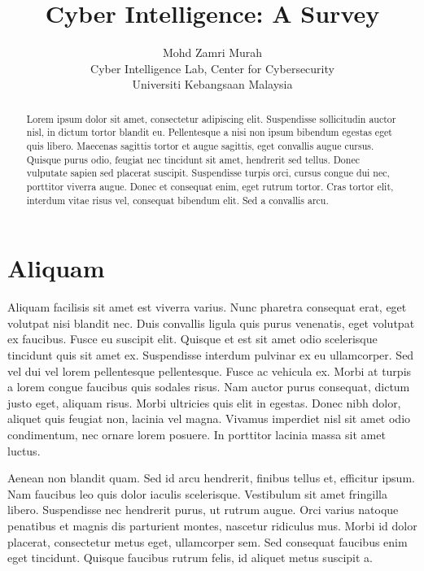 \documentclass[12pt]{article} %
\title{Cyber Intelligence: A Survey}
\author{Mohd Zamri Murah\\
\small{Cyber Intelligence Lab, Center for Cybersecurity}\\
\small{Universiti Kebangsaan Malaysia}}
\date{} %
\begin{document}
\nocite{*}

\maketitle

\begin{abstract}
Lorem ipsum dolor sit amet, consectetur adipiscing elit. Suspendisse sollicitudin auctor nisl, in
dictum tortor blandit eu. Pellentesque a nisi non ipsum bibendum egestas eget quis libero. Maecenas
sagittis tortor et augue sagittis, eget convallis augue cursus. Quisque purus odio, feugiat nec
tincidunt sit amet, hendrerit sed tellus. Donec vulputate sapien sed placerat suscipit. Suspendisse
turpis orci, cursus congue dui nec, porttitor viverra augue. Donec et consequat enim, eget rutrum
tortor. Cras tortor elit, interdum vitae risus vel, consequat bibendum elit. Sed a convallis arcu.
\end{abstract}

\section{Aliquam}


Aliquam facilisis sit amet est viverra varius. Nunc pharetra consequat erat, eget volutpat nisi
blandit nec. Duis convallis ligula quis purus venenatis, eget volutpat ex faucibus. Fusce eu suscipit
elit. Quisque et est sit amet odio scelerisque tincidunt quis sit amet ex. Suspendisse interdum
pulvinar ex eu ullamcorper. Sed vel dui vel lorem pellentesque pellentesque. Fusce ac vehicula ex.
Morbi at turpis a lorem congue faucibus quis sodales risus. Nam auctor purus consequat, dictum justo
eget, aliquam risus. Morbi ultricies quis elit in egestas. Donec nibh dolor, aliquet quis feugiat non,
lacinia vel magna. Vivamus imperdiet nisl sit amet odio condimentum, nec ornare lorem posuere. In
porttitor lacinia massa sit amet luctus.

Aenean non blandit quam. Sed id arcu hendrerit, finibus tellus et, efficitur ipsum. Nam faucibus leo
quis dolor iaculis scelerisque. Vestibulum sit amet fringilla libero. Suspendisse nec hendrerit purus,
ut rutrum augue. Orci varius natoque penatibus et magnis dis parturient montes, nascetur ridiculus
mus. Morbi id dolor placerat, consectetur metus eget, ullamcorper sem. Sed consequat faucibus enim
eget tincidunt. Quisque faucibus rutrum felis, id aliquet metus suscipit a.
\end{document}
